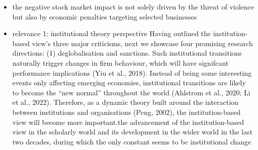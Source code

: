 \documentclass[12pt,a4paper]{article}
\begin{document}
\begin{itemize}
 \item the negative stock market impact is not solely driven by the threat of violence but also by economic penalties targeting selected businesses \citep{he_hurting_2017}
  \item relevance 1: institutional theory perspective \cite{peng_toward_2023}
  Having outlined the institution-based view’s three major criticisms, next we showcase four promising research directions: (1) deglobalisation and sanctions. Such institutional transitions naturally trigger changes in firm behaviour, which will have signifcant performance implications (Yiu et al., 2018).  Instead of being some interesting events only affecting emerging economies, institutional transitions are likely to become the “new normal” throughout the world (Ahlstrom et al., 2020; Li et al., 2022). Therefore, as a dynamic theory built around the interaction between institutions and organisations (Peng, 2002), the institution-based view will become more important.the advancement of the institution-based view in the scholarly world and its development in the wider world in the last two decades, during which the only constant seems to be institutional change

\end{itemize}
\end{document}
